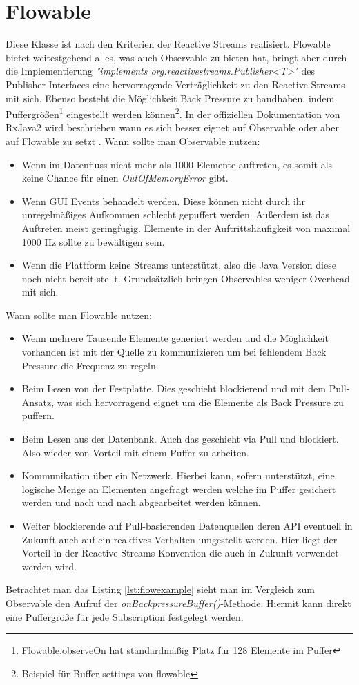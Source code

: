 \section{Flowable}
Diese Klasse ist nach den Kriterien der Reactive Streams realisiert. Flowable bietet weitestgehend alles, was auch Observable zu bieten hat, bringt aber durch die Implementierung \textit{"implements org.reactivestreams.Publisher<T>"} des Publisher Interfaces eine  hervorragende Verträglichkeit zu den Reactive Streams mit sich. Ebenso besteht die Möglichkeit Back Pressure zu handhaben, indem Puffergrößen\footnote{Flowable.observeOn hat standardmäßig Platz für 128 Elemente im Puffer} eingestellt werden können\footnote{Beispiel für Buffer settings von flowable}. In der offiziellen Dokumentation von RxJava2 wird beschrieben wann es sich besser eignet auf Observable oder aber auf Flowable zu setzt \cite{rxdifference}. \underline{Wann sollte man Observable nutzen:}
\begin{itemize}
	\item Wenn im Datenfluss nicht mehr als 1000 Elemente auftreten, es somit als keine Chance für einen \textit{OutOfMemoryError} gibt.
	\item Wenn GUI Events behandelt werden. Diese können nicht durch ihr unregelmäßiges Aufkommen schlecht gepuffert werden. Außerdem ist das Auftreten meist geringfügig. Elemente in der Auftrittshäufigkeit von maximal 1000 Hz sollte zu bewältigen sein.
	\item Wenn die Plattform keine Streams unterstützt, also die Java Version diese noch nicht bereit stellt. Grundsätzlich bringen Observables weniger Overhead mit sich.
\end{itemize}
\underline{Wann sollte man Flowable nutzen:}
\begin{itemize}
	\item Wenn mehrere Tausende Elemente generiert werden und die Möglichkeit vorhanden ist mit der Quelle zu kommunizieren um bei fehlendem Back Pressure die Frequenz zu regeln.
	\item Beim Lesen von der Festplatte. Dies geschieht blockierend und mit dem Pull-Ansatz, was sich hervorragend eignet um die Elemente als Back Pressure zu puffern.
	\item Beim Lesen aus der Datenbank. Auch das geschieht via Pull und blockiert. Also wieder von Vorteil mit einem Puffer zu arbeiten.
	\item Kommunikation über ein Netzwerk. Hierbei kann, sofern unterstützt, eine logische Menge an Elementen angefragt werden welche im Puffer gesichert werden und nach und nach abgearbeitet werden können.
	\item Weiter blockierende auf Pull-basierenden Datenquellen deren API eventuell in Zukunft auch auf ein reaktives Verhalten umgestellt werden. Hier liegt der Vorteil in der Reactive Streams Konvention die auch in Zukunft verwendet werden wird.
\end{itemize}
Betrachtet man das Listing \ref{lst:flowexample} sieht man im Vergleich zum Observable den Aufruf der \textit{onBackpressureBuffer()}-Methode. Hiermit kann direkt eine Puffergröße für jede Subscription festgelegt werden. 

